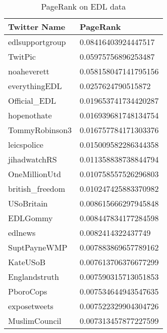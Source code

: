 \begin{table}[htbp]%
\centering
\begin{tabular}{|l|l|}
\hline
Twitter Name & PageRank \\
\hline
edlsupportgroup & 0.08416403924447517 \\
TwitPic & 0.05975756896253487 \\
noaheverett & 0.058158047141795156 \\
everythingEDL & 0.0257624790515872 \\
Official\_EDL & 0.019653741734420287 \\
hopenothate & 0.016939681748134754 \\
TommyRobinson3 & 0.016757784171303376 \\
leicspolice & 0.015009582286344358 \\
jihadwatchRS & 0.011358838738844794 \\
OneMillionUtd & 0.010758557526296803 \\
british\_freedom & 0.010247425883370982 \\
USoBritain & 0.008615666297945848 \\
EDLGommy & 0.008447834177284598 \\
edlnews & 0.0082414322437749 \\
SuptPayneWMP & 0.007883869657789162 \\
KateUSoB & 0.007613706376677299 \\
Englandstruth & 0.007590315713051853 \\
PboroCops & 0.007534644943547635 \\
exposetweets & 0.007522329904304726 \\
MuslimCouncil & 0.007313457877227599 \\
\hline
\end{tabular}
\caption{PageRank on EDL data}
\label{tab:edlpagerank}
\end{table}

